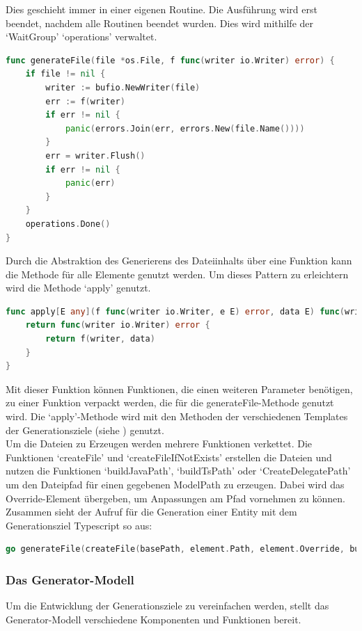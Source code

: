 \documentclass[./einleitung.tex]{subfiles}
\begin{document}
    Dies geschieht immer in einer eigenen Routine.
    Die Ausführung wird erst beendet, nachdem alle Routinen beendet wurden.
    Dies wird mithilfe der `WaitGroup' `operations' verwaltet.
    \begin{lstlisting}[language=Go, caption=Die Methode generateFile, label=lst:generateFile]
func generateFile(file *os.File, f func(writer io.Writer) error) {
	if file != nil {
		writer := bufio.NewWriter(file)
		err := f(writer)
		if err != nil {
			panic(errors.Join(err, errors.New(file.Name())))
		}
		err = writer.Flush()
		if err != nil {
			panic(err)
		}
	}
	operations.Done()
}
    \end{lstlisting}
    Durch die Abstraktion des Generierens des Dateiinhalts über eine Funktion kann die Methode für alle Elemente genutzt werden.
    Um dieses Pattern zu erleichtern wird die Methode `apply' genutzt.
    \begin{lstlisting}[language=Go, caption=Die apply-Methode, label=lst:apply]
func apply[E any](f func(writer io.Writer, e E) error, data E) func(writer io.Writer) error {
	return func(writer io.Writer) error {
		return f(writer, data)
	}
}
    \end{lstlisting}
    Mit dieser Funktion können Funktionen, die einen weiteren Parameter benötigen, zu einer Funktion verpackt werden, die für die generateFile-Methode genutzt wird.
    Die `apply'-Methode wird mit den Methoden der verschiedenen Templates der Generationsziele (siehe ) genutzt.\\

    Um die Dateien zu Erzeugen werden mehrere Funktionen verkettet.
    Die Funktionen `createFile' und `createFileIfNotExists' erstellen die Dateien und nutzen die Funktionen `buildJavaPath', `buildTsPath' oder `CreateDelegatePath' um den Dateipfad für einen gegebenen ModelPath zu erzeugen.
    Dabei wird das Override-Element übergeben, um Anpassungen am Pfad vornehmen zu können.\\
    Zusammen sieht der Aufruf für die Generation einer Entity mit dem Generationsziel Typescript so aus:
    \begin{lstlisting}[language=Go, caption=Generation einer Entity, label=lst:generateEntity]
go generateFile(createFile(basePath, element.Path, element.Override, buildTsPath), apply(template.GenerateEntity, element))
    \end{lstlisting}

    \subsubsection{Das Generator-Modell}\label{subsubsec:generator-modell}
    Um die Entwicklung der Generationsziele zu vereinfachen werden, stellt das Generator-Modell verschiedene Komponenten und Funktionen bereit.
\end{document}
